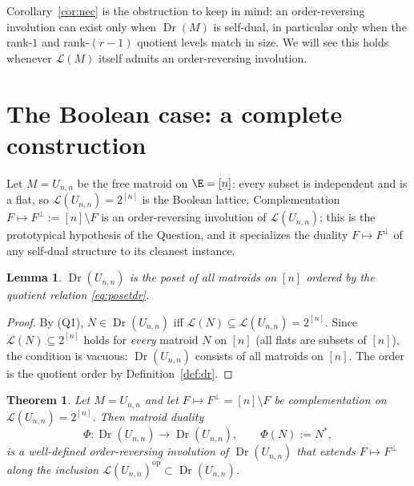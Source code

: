 \documentclass[11pt]{article}
\newcommand{\Dr}{\operatorname{Dr}}
\newcommand{\op}{\mathrm{op}}
\newcommand{\cL}{\mathcal{L}}
\newcommand{\dual}[1]{#1^{\ast}}
\newtheorem{theorem}{Theorem}
\newtheorem{lemma}{Lemma}
\theoremstyle{definition}
\theoremstyle{remark}
\begin{document}
Corollary~\ref{cor:nec} is the obstruction to keep in mind: an order-reversing
involution can exist only when $\Dr(M)$ is self-dual, in particular only when the
rank-$1$ and rank-$(r-1)$ quotient levels match in size. We will see this holds
whenever $\cL(M)$ itself admits an order-reversing involution.

\section{The Boolean case: a complete construction}\label{sec:boolean}

Let $M=U_{n,n}$ be the free matroid on $\E=[n]$: every subset is independent and is
a flat, so $\cL(U_{n,n})=2^{[n]}$ is the Boolean lattice. Complementation
$F\mapsto F^{\perp}:=[n]\setminus F$ is an order-reversing involution of $\cL(U_{n,n})$;
this is the prototypical hypothesis of the Question, and it specializes the duality
$F\mapsto F^{\perp}$ of any self-dual structure to its cleanest instance.

\begin{lemma}\label{lem:boolean-dr}
$\Dr(U_{n,n})$ is the poset of \emph{all} matroids on $[n]$ ordered by the quotient
relation \eqref{eq:posetdr}.
\end{lemma}

\begin{proof}
By (Q1), $N\in\Dr(U_{n,n})$ iff $\cL(N)\subseteq\cL(U_{n,n})=2^{[n]}$. Since
$\cL(N)\subseteq 2^{[n]}$ holds for \emph{every} matroid $N$ on $[n]$ (all flats are
subsets of $[n]$), the condition is vacuous: $\Dr(U_{n,n})$ consists of all matroids
on $[n]$. The order is the quotient order by Definition~\ref{def:dr}.
\end{proof}

\begin{theorem}\label{thm:boolean}
Let $M=U_{n,n}$ and let $F\mapsto F^{\perp}=[n]\setminus F$ be complementation on
$\cL(U_{n,n})=2^{[n]}$. Then matroid duality
\[
\Phi:\Dr(U_{n,n})\longrightarrow \Dr(U_{n,n}),\qquad \Phi(N):=\dual N,
\]
is a well-defined order-reversing involution of $\Dr(U_{n,n})$ that extends
$F\mapsto F^{\perp}$ along the inclusion $\cL(U_{n,n})^{\op}\subset\Dr(U_{n,n})$.
\end{theorem}
\end{document}
